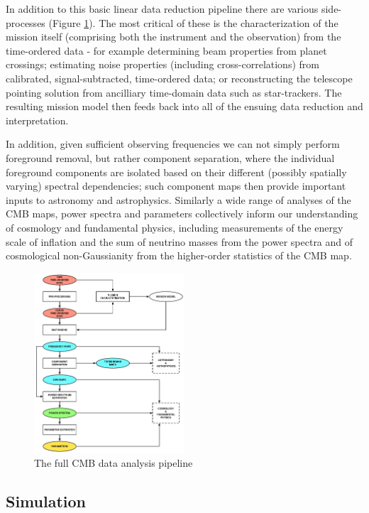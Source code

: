 In addition to this basic linear data reduction pipeline there are various side-processes (Figure \ref{fig_da}). The most critical of these is the characterization of the mission itself (comprising both the instrument and the observation) from the time-ordered data - for example determining beam properties from planet crossings; estimating noise properties (including cross-correlations) from calibrated, signal-subtracted, time-ordered data; or reconstructing the telescope pointing solution from ancilliary time-domain data such as star-trackers. The resulting mission model then feeds back into all of the ensuing data reduction and interpretation.

In addition, given sufficient observing frequencies we can not simply perform foreground removal, but rather component separation, where the individual foreground components are isolated based on their different (possibly spatially varying) spectral dependencies; such component maps then provide important inputs to astronomy and astrophysics. Similarly a wide range of analyses of the CMB maps, power spectra and parameters collectively inform our understanding of cosmology and fundamental physics, including measurements of the energy scale of inflation and the sum of neutrino masses from the power spectra and of cosmological non-Gaussianity from the higher-order statistics of the CMB map.

\begin{figure}[htbp]
\hspace*{3in}\includegraphics[width=0.5\textwidth]{Analysis/da}
\caption{The full CMB data analysis pipeline}
\label{fig_da}
\end{figure}

\newpage

\subsection{Simulation}

